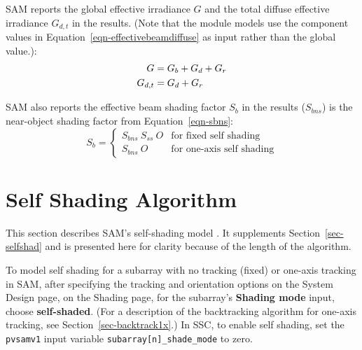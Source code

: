 \documentclass[12pt,letterpaper]{article}
\begin{document}
SAM reports the global effective irradiance $G$ and the total diffuse effective irradiance $G_{d,t}$ in the results. (Note that the module models use the component values in Equation~\ref{eqn-effectivebeamdiffuse} as input rather than the global value.):
\begin{align}
G &= G_b + G_d + G_r\notag\\
G_{d,t} & = G_d + G_r
\end{align}

SAM also reports the effective beam shading factor $S_b$ in the results ($S_{bns}$) is the near-object shading factor from Equation~\ref{eqn-sbns}:
\begin{equation}
S_b = \left\{
\begin{array}{ll}
S_{bns}~S_{ss}~O &\text{for fixed self shading}\\
S_{bns}~O &\text{for one-axis self shading} 
\end{array}
\right.
\end{equation}

\chapter{Self Shading Algorithm}\label{sec-selfshadalg}

This section describes SAM's self-shading model \citep{deline2013a}. It supplements Section~\ref{sec-selfshad} and is presented here for clarity because of the length of the algorithm.

To model self shading for a subarray with no tracking (fixed) or one-axis tracking in SAM, after specifying the tracking and orientation options on the System Design page, on the Shading page, for the subarray's \textbf{Shading mode} input, choose \textbf{self-shaded}. (For a description of the backtracking algorithm for one-axis tracking, see Section~\ref{sec-backtrack1x}.) In SSC, to enable self shading, set the \texttt{pvsamv1} input variable \texttt{subarray[n]\_shade\_mode} to zero.
\end{document}
